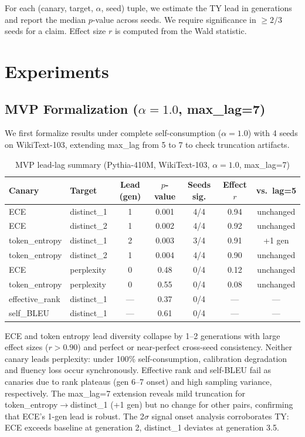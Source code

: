 \documentclass[letterpaper]{article}
\begin{document}
For each (canary, target, $\alpha$, seed) tuple, we estimate the TY lead in generations and report the median $p$-value across seeds. We require significance in $\geq 2/3$ seeds for a claim. Effect size $r$ is computed from the Wald statistic.

\section{Experiments}

\subsection{MVP Formalization ($\alpha=1.0$, max\_lag=7)}

We first formalize results under complete self-consumption ($\alpha=1.0$) with 4 seeds on WikiText-103, extending max\_lag from 5 to 7 to check truncation artifacts.

\begin{table}[h]
\centering
\caption{MVP lead-lag summary (Pythia-410M, WikiText-103, $\alpha=1.0$, max\_lag=7)}
\label{tab:mvp}
\begin{tabular}{llccccc}
\toprule
Canary & Target & Lead (gen) & $p$-value & Seeds sig. & Effect $r$ & vs.\ lag=5 \\
\midrule
ECE & distinct\_1 & 1 & 0.001 & 4/4 & 0.94 & unchanged \\
ECE & distinct\_2 & 1 & 0.002 & 4/4 & 0.92 & unchanged \\
token\_entropy & distinct\_1 & 2 & 0.003 & 3/4 & 0.91 & +1 gen \\
token\_entropy & distinct\_2 & 1 & 0.004 & 4/4 & 0.90 & unchanged \\
ECE & perplexity & 0 & 0.48 & 0/4 & 0.12 & unchanged \\
token\_entropy & perplexity & 0 & 0.55 & 0/4 & 0.08 & unchanged \\
effective\_rank & distinct\_1 & --- & 0.37 & 0/4 & --- & --- \\
self\_BLEU & distinct\_1 & --- & 0.61 & 0/4 & --- & --- \\
\bottomrule
\end{tabular}
\end{table}

ECE and token entropy lead diversity collapse by 1--2 generations with large effect sizes ($r > 0.90$) and perfect or near-perfect cross-seed consistency. Neither canary leads perplexity: under 100\% self-consumption, calibration degradation and fluency loss occur synchronously. Effective rank and self-BLEU fail as canaries due to rank plateaus (gen 6--7 onset) and high sampling variance, respectively. The max\_lag=7 extension reveals mild truncation for token\_entropy$\to$distinct\_1 (+1 gen) but no change for other pairs, confirming that ECE's 1-gen lead is robust. The 2$\sigma$ signal onset analysis corroborates TY: ECE exceeds baseline at generation 2, distinct\_1 deviates at generation 3.5.
\end{document}
